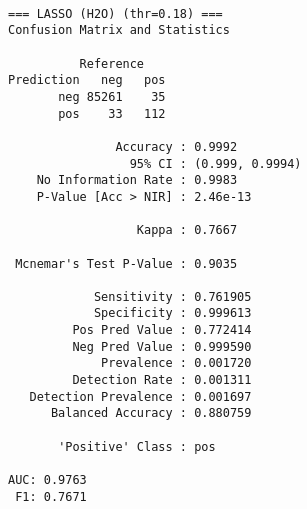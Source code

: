 \documentclass[
  11pt,
  letterpaper,
  DIV=11,
  numbers=noendperiod]{scrartcl}
\newenvironment{Shaded}{}{}
\newcommand{\AttributeTok}[1]{\textcolor[rgb]{0.84,0.23,0.29}{#1}}
\newcommand{\CommentTok}[1]{\textcolor[rgb]{0.42,0.45,0.49}{#1}}
\newcommand{\ConstantTok}[1]{\textcolor[rgb]{0.00,0.36,0.77}{#1}}
\newcommand{\DocumentationTok}[1]{\textcolor[rgb]{0.42,0.45,0.49}{#1}}
\newcommand{\FunctionTok}[1]{\textcolor[rgb]{0.44,0.26,0.76}{#1}}
\newcommand{\NormalTok}[1]{\textcolor[rgb]{0.14,0.16,0.18}{#1}}
\newcommand{\OtherTok}[1]{\textcolor[rgb]{0.44,0.26,0.76}{#1}}
\newcommand{\SpecialCharTok}[1]{\textcolor[rgb]{0.00,0.36,0.77}{#1}}
\newcommand{\StringTok}[1]{\textcolor[rgb]{0.01,0.18,0.38}{#1}}
\begin{document}
\begin{verbatim}

=== LASSO (H2O) (thr=0.18) ===
Confusion Matrix and Statistics

          Reference
Prediction   neg   pos
       neg 85261    35
       pos    33   112
                                         
               Accuracy : 0.9992         
                 95% CI : (0.999, 0.9994)
    No Information Rate : 0.9983         
    P-Value [Acc > NIR] : 2.46e-13       
                                         
                  Kappa : 0.7667         
                                         
 Mcnemar's Test P-Value : 0.9035         
                                         
            Sensitivity : 0.761905       
            Specificity : 0.999613       
         Pos Pred Value : 0.772414       
         Neg Pred Value : 0.999590       
             Prevalence : 0.001720       
         Detection Rate : 0.001311       
   Detection Prevalence : 0.001697       
      Balanced Accuracy : 0.880759       
                                         
       'Positive' Class : pos            
                                         
AUC: 0.9763 
 F1: 0.7671 
\end{verbatim}

\begin{Shaded}
\end{Shaded}
\end{document}
